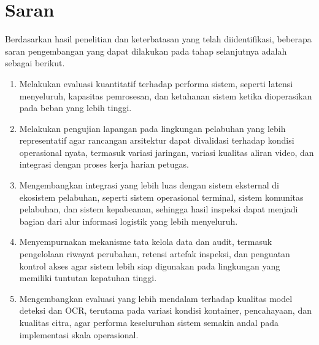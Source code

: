 \section{Saran}

Berdasarkan hasil penelitian dan keterbatasan yang telah diidentifikasi,
beberapa saran pengembangan yang dapat dilakukan pada tahap selanjutnya adalah
sebagai berikut.

\begin{enumerate}
    \item Melakukan evaluasi kuantitatif terhadap performa sistem, seperti
    latensi menyeluruh, kapasitas pemrosesan, dan ketahanan sistem ketika
    dioperasikan pada beban yang lebih tinggi.

    \item Melakukan pengujian lapangan pada lingkungan pelabuhan yang lebih
    representatif agar rancangan arsitektur dapat divalidasi terhadap kondisi
    operasional nyata, termasuk variasi jaringan, variasi kualitas aliran video,
    dan integrasi dengan proses kerja harian petugas.

    \item Mengembangkan integrasi yang lebih luas dengan sistem eksternal di
    ekosistem pelabuhan, seperti sistem operasional terminal, sistem komunitas
    pelabuhan, dan sistem kepabeanan, sehingga hasil inspeksi dapat menjadi
    bagian dari alur informasi logistik yang lebih menyeluruh.

    \item Menyempurnakan mekanisme tata kelola data dan audit, termasuk
    pengelolaan riwayat perubahan, retensi artefak inspeksi, dan penguatan
    kontrol akses agar sistem lebih siap digunakan pada lingkungan yang memiliki
    tuntutan kepatuhan tinggi.

    \item Mengembangkan evaluasi yang lebih mendalam terhadap kualitas model
    deteksi dan OCR, terutama pada variasi kondisi kontainer, pencahayaan, dan
    kualitas citra, agar performa keseluruhan sistem semakin andal pada
    implementasi skala operasional.
\end{enumerate}
